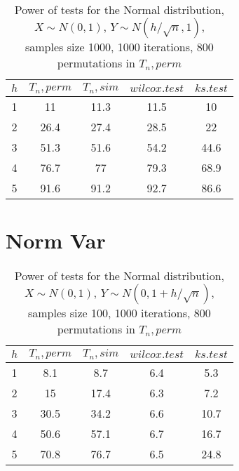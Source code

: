 \documentclass{report}
\begin{document}
\begin{longtable}{|c|c|c|c|c|}
  \caption{Power of tests for the Normal distribution, \\
           $X\sim N(0,1)$, $Y\sim N(h/\sqrt{n},1)$, \\
           samples size 1000, 1000 iterations, 800 permutations in $T_n, perm$} \\
  \hline
  $h$  & $T_n, perm$ & $T_n, sim$ & $wilcox.test$ & $ks.test$ \\ \hline
  1 & 11 & 11.3 & 11.5 & 10 \\
  2 & 26.4 & 27.4 & 28.5 & 22 \\
  3 & 51.3 & 51.6 & 54.2 & 44.6 \\
  4 & 76.7 & 77 & 79.3 & 68.9 \\
  5 & 91.6 & 91.2 & 92.7 & 86.6 \\
  \hline
\end{longtable}

\newpage

\section*{Norm Var}

\begin{longtable}{|c|c|c|c|c|}
  \caption{Power of tests for the Normal distribution, \\
           $X\sim N(0,1)$, $Y\sim N(0, 1 + h/\sqrt{n})$, \\
           samples size 100, 1000 iterations, 800 permutations in $T_n, perm$} \\
  \hline
  $h$ & $T_n, perm$ & $T_n, sim$ & $wilcox.test$ & $ks.test$ \\
  \hline
  1 & 8.1 & 8.7 & 6.4 & 5.3 \\
  2 & 15 & 17.4 & 6.3 & 7.2 \\
  3 & 30.5 & 34.2 & 6.6 & 10.7 \\
  4 & 50.6 & 57.1 & 6.7 & 16.7 \\
  5 & 70.8 & 76.7 & 6.5 & 24.8 \\
  \hline
\end{longtable}
\end{document}
